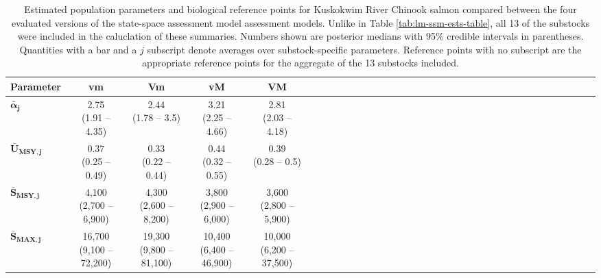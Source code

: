 \documentclass[12pt,]{book}
\theoremstyle{definition}
\theoremstyle{definition}
\theoremstyle{definition}
\theoremstyle{remark}
\begin{document}
\clearpage

\begin{table}[H]

\caption{\label{tab:ssm-ests-table}Estimated population parameters and biological reference points for Kuskokwim River Chinook salmon compared between the four evaluated versions of the state-space assessment model assessment models. Unlike in Table \ref{tab:lm-ssm-ests-table}, all 13 of the substocks were included in the caluclation of these summaries. Numbers shown are posterior medians with 95\% credible intervals in parentheses. Quantities with a bar and a $j$ subscript denote averages over substock-specific parameters. Reference points with no subscript are the appropriate reference points for the aggregate of the 13 substocks included.}
\centering
\begin{tabular}[t]{lcccccclcccccclcccccclcccccclcccccc}
\toprule
\textbf{Parameter} & \textbf{vm} & \textbf{Vm} & \textbf{vM} & \textbf{VM}\\
\midrule
$\boldsymbol{\bar{\alpha}_j}$ & \makecell[c]{2.75\\(1.91 -- 4.35)} & \makecell[c]{2.44\\(1.78 -- 3.5)} & \makecell[c]{3.21\\(2.25 -- 4.66)} & \makecell[c]{2.81\\(2.03 -- 4.18)}\\
$\boldsymbol{\bar{U}_{\text{MSY},j}}$ & \makecell[c]{0.37\\(0.25 -- 0.49)} & \makecell[c]{0.33\\(0.22 -- 0.44)} & \makecell[c]{0.44\\(0.32 -- 0.55)} & \makecell[c]{0.39\\(0.28 -- 0.5)}\\
$\boldsymbol{\bar{S}_{\text{MSY},j}}$ & \makecell[c]{4,100\\(2,700 -- 6,900)} & \makecell[c]{4,300\\(2,600 -- 8,200)} & \makecell[c]{3,800\\(2,900 -- 6,000)} & \makecell[c]{3,600\\(2,800 -- 5,900)}\\
$\boldsymbol{\bar{S}_{\text{MAX},j}}$ & \makecell[c]{16,700\\(9,100 -- 72,200)} & \makecell[c]{19,300\\(9,800 -- 81,100)} & \makecell[c]{10,400\\(6,400 -- 46,900)} & \makecell[c]{10,000\\(6,200 -- 37,500)}\\

\end{tabular}
\end{table}
\end{document}

